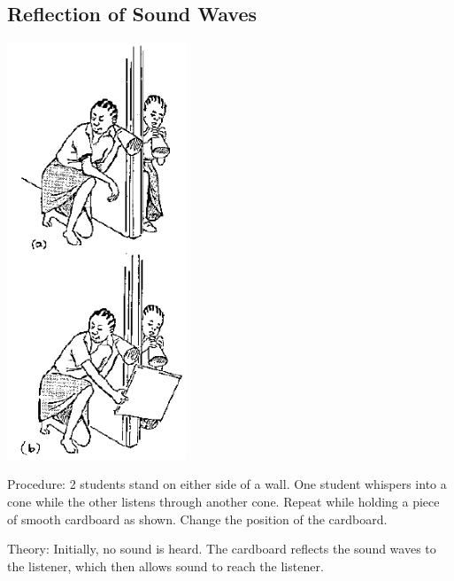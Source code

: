 \begin{multicols}{2}
\subsection{Reflection of Sound Waves}

\begin{center}
\includegraphics[width=0.4\textwidth]{./img/source/reflection-sound-waves.png}
\end{center}

\begin{description*}
\item[Procedure:]{2 students stand on either side of a wall. One student whispers into a cone while the other listens through another cone. Repeat while holding a piece of smooth cardboard as shown. Change the position of the cardboard.}
\item[Theory:]{Initially, no sound is heard. The cardboard reflects the sound waves to the listener, which then allows sound to reach the listener.}
\end{description*}


\end{multicols}
